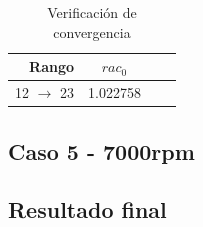 \documentclass[11pt]{article}
\begin{document}
\begin{table}
    \centering
    \begin{tabular}{rccc}\toprule
        Rango               & $rac_0$  \\ \midrule
        12 $\rightarrow$ 23 & 1.022758 \\ \bottomrule
    \end{tabular}
    \caption{Verificación de convergencia}
    \label{tab:rac_caso_5}
\end{table}

\subsection{Caso 5 - 7000rpm}

\subsection{Resultado final}
\end{document}
